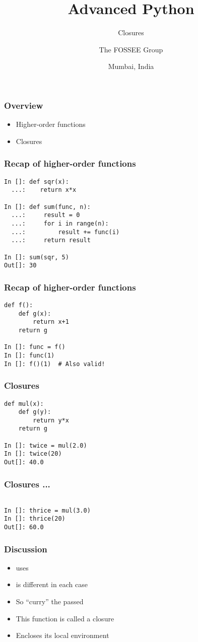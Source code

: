 \documentclass[14pt,compress,aspectratio=169]{beamer}
\title[Closures]{Advanced Python}
\subtitle{Closures}
\author[FOSSEE] {The FOSSEE Group}
\institute[IIT Bombay] {Department of Aerospace Engineering\\IIT Bombay}
\date[] {Mumbai, India}
\begin{document}
\begin{frame}
  \titlepage
\end{frame}

\begin{frame}
  \frametitle{Overview}
  \begin{itemize}
  \item Higher-order functions
  \item Closures
  \end{itemize}
\end{frame}

\begin{frame}[fragile]
  \frametitle{Recap of higher-order functions}
  \begin{lstlisting}
In []: def sqr(x):
  ...:    return x*x

In []: def sum(func, n):
  ...:     result = 0
  ...:     for i in range(n):
  ...:         result += func(i)
  ...:     return result

In []: sum(sqr, 5)
Out[]: 30
  \end{lstlisting}
\end{frame}

\begin{frame}[fragile]
  \frametitle{Recap of higher-order functions}
  \begin{lstlisting}
def f():
    def g(x):
        return x+1
    return g

In []: func = f()
In []: func(1)
In []: f()(1)  # Also valid!
  \end{lstlisting}
\end{frame}


\begin{frame}[fragile]
  \frametitle{Closures}
  \begin{lstlisting}
def mul(x):
    def g(y):
        return y*x
    return g

In []: twice = mul(2.0)
In []: twice(20)
Out[]: 40.0
  \end{lstlisting}
\end{frame}

\begin{frame}[fragile]
  \frametitle{Closures ...}
  \begin{lstlisting}

In []: thrice = mul(3.0)
In []: thrice(20)
Out[]: 60.0
  \end{lstlisting}
\end{frame}

\begin{frame}
  \frametitle{Discussion}
  \begin{itemize}
  \item {} uses 
  \item {} is different in each case
  \item So  ``curry'' the passed 
  \item This function is called a closure
  \item Encloses its local environment
  \end{itemize}
\end{frame}
\end{document}
